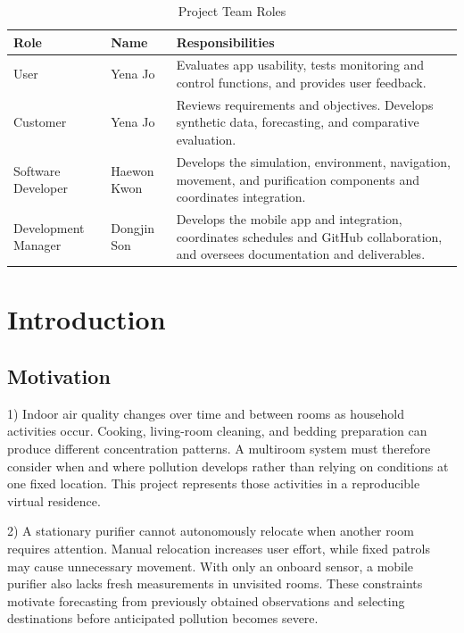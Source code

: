 \documentclass[conference]{IEEEtran}
\newlength{\tablebodywidth}
\begin{document}
\begin{table}[!t]
\caption{Project Team Roles}
\label{tab:t0}
\centering\footnotesize
\setlength{\tabcolsep}{3pt}
\setlength{\tablebodywidth}{\dimexpr\columnwidth-18pt\relax}
\begin{tabular}{>{\raggedright\arraybackslash}p{0.220\tablebodywidth}>{\raggedright\arraybackslash}p{0.180\tablebodywidth}>{\raggedright\arraybackslash}p{0.600\tablebodywidth}}
\toprule
\textbf{Role} & \textbf{Name} & \textbf{Responsibilities} \\
\midrule
User & Yena Jo & Evaluates app usability, tests monitoring and control functions, and provides user feedback. \\
Customer & Yena Jo & Reviews requirements and objectives. Develops synthetic data, forecasting, and comparative evaluation. \\
Software Developer & Haewon Kwon & Develops the simulation, environment, navigation, movement, and purification components and coordinates integration. \\
Development Manager & Dongjin Son & Develops the mobile app and integration, coordinates schedules and GitHub collaboration, and oversees documentation and deliverables. \\
\bottomrule
\end{tabular}
\end{table}

\section{Introduction}

\subsection{Motivation}

1) Indoor air quality changes over time and between rooms as household activities occur. Cooking, living-room cleaning, and bedding preparation can produce different concentration patterns. A multiroom system must therefore consider when and where pollution develops rather than relying on conditions at one fixed location. This project represents those activities in a reproducible virtual residence.

2) A stationary purifier cannot autonomously relocate when another room requires attention. Manual relocation increases user effort, while fixed patrols may cause unnecessary movement. With only an onboard sensor, a mobile purifier also lacks fresh measurements in unvisited rooms. These constraints motivate forecasting from previously obtained observations and selecting destinations before anticipated pollution becomes severe.
\end{document}
